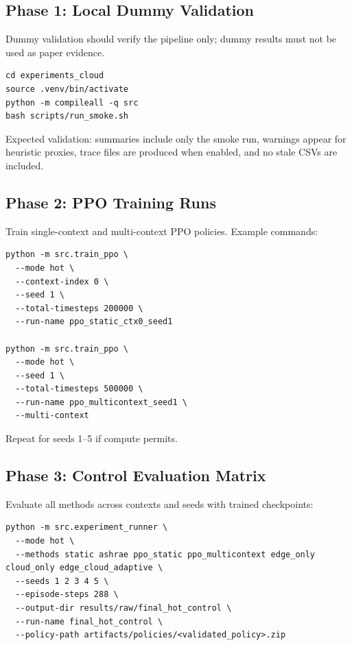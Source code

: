 \documentclass[11pt,a4paper]{article}
\begin{document}
\subsection{Phase 1: Local Dummy Validation}

Dummy validation should verify the pipeline only; dummy results must not be used as paper evidence.

\begin{verbatim}
cd experiments_cloud
source .venv/bin/activate
python -m compileall -q src
bash scripts/run_smoke.sh
\end{verbatim}

Expected validation: summaries include only the smoke run, warnings appear for heuristic proxies, trace files are produced when enabled, and no stale CSVs are included.

\subsection{Phase 2: PPO Training Runs}

Train single-context and multi-context PPO policies. Example commands:

\begin{verbatim}
python -m src.train_ppo \
  --mode hot \
  --context-index 0 \
  --seed 1 \
  --total-timesteps 200000 \
  --run-name ppo_static_ctx0_seed1

python -m src.train_ppo \
  --mode hot \
  --seed 1 \
  --total-timesteps 500000 \
  --run-name ppo_multicontext_seed1 \
  --multi-context
\end{verbatim}

Repeat for seeds 1--5 if compute permits.

\subsection{Phase 3: Control Evaluation Matrix}

Evaluate all methods across contexts and seeds with trained checkpoints:

\begin{verbatim}
python -m src.experiment_runner \
  --mode hot \
  --methods static ashrae ppo_static ppo_multicontext edge_only cloud_only edge_cloud_adaptive \
  --seeds 1 2 3 4 5 \
  --episode-steps 288 \
  --output-dir results/raw/final_hot_control \
  --run-name final_hot_control \
  --policy-path artifacts/policies/<validated_policy>.zip
\end{verbatim}
\end{document}
